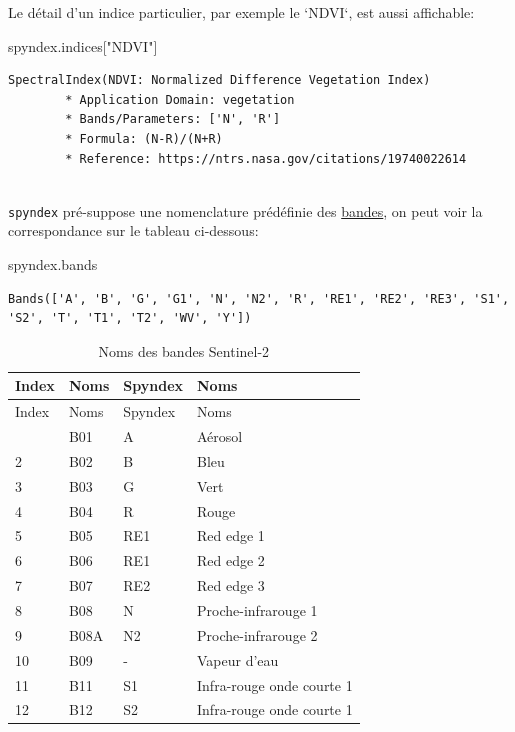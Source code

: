 \documentclass[
  french,
  11pt,
  letterpaper,
  open=any,
  twoside=false,
  french]{scrbook}
\newenvironment{Shaded}{\begin{snugshade}}{\end{snugshade}}
\newcommand{\NormalTok}[1]{\textcolor[rgb]{0.00,0.23,0.31}{#1}}
\newcommand{\StringTok}[1]{\textcolor[rgb]{0.13,0.47,0.30}{#1}}
\begin{document}
Le détail d'un indice particulier, par exemple le `NDVI`, est aussi
affichable:

\begin{Shaded}
\begin{Highlighting}[]
\NormalTok{spyndex.indices[}\StringTok{"NDVI"}\NormalTok{]}
\end{Highlighting}
\end{Shaded}

\begin{verbatim}
SpectralIndex(NDVI: Normalized Difference Vegetation Index)
        * Application Domain: vegetation
        * Bands/Parameters: ['N', 'R']
        * Formula: (N-R)/(N+R)
        * Reference: https://ntrs.nasa.gov/citations/19740022614
        
\end{verbatim}

\texttt{spyndex} pré-suppose une nomenclature prédéfinie des
\href{https://awesome-ee-spectral-indices.readthedocs.io/en/latest/\#expressions}{bandes},
on peut voir la correspondance sur le tableau ci-dessous:

\begin{Shaded}
\begin{Highlighting}[]
\NormalTok{spyndex.bands}
\end{Highlighting}
\end{Shaded}

\begin{verbatim}
Bands(['A', 'B', 'G', 'G1', 'N', 'N2', 'R', 'RE1', 'RE2', 'RE3', 'S1', 'S2', 'T', 'T1', 'T2', 'WV', 'Y'])
\end{verbatim}

\begin{longtable}[]{@{}llll@{}}
\caption{Noms des bandes Sentinel-2}\tabularnewline
\toprule\noalign{}
Index & Noms & Spyndex & Noms \\
\midrule\noalign{}
\endfirsthead
\toprule\noalign{}
Index & Noms & Spyndex & Noms \\
\midrule\noalign{}
\endhead
\bottomrule\noalign{}
\endlastfoot
1 & B01 & A & Aérosol \\
2 & B02 & B & Bleu \\
3 & B03 & G & Vert \\
4 & B04 & R & Rouge \\
5 & B05 & RE1 & Red edge 1 \\
6 & B06 & RE1 & Red edge 2 \\
7 & B07 & RE2 & Red edge 3 \\
8 & B08 & N & Proche-infrarouge 1 \\
9 & B08A & N2 & Proche-infrarouge 2 \\
10 & B09 & - & Vapeur d'eau \\
11 & B11 & S1 & Infra-rouge onde courte 1 \\
12 & B12 & S2 & Infra-rouge onde courte 1 \\
\end{longtable}
\end{document}
